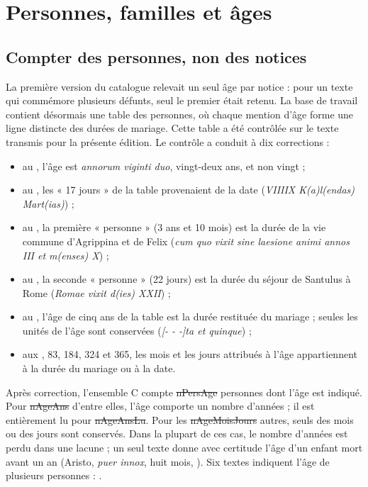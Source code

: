 \chapter{Personnes, familles et âges}\label{ch:personnes}

\section{Compter des personnes, non des notices}

La première version du catalogue relevait un seul âge par notice : pour un texte qui commémore plusieurs défunts, seul le premier était retenu. La base de travail contient désormais une table des personnes, où chaque mention d’âge forme une ligne distincte des durées de mariage. Cette table a été contrôlée sur le texte transmis pour la présente édition. Le contrôle a conduit à dix corrections :

\begin{itemize}
\item au , l’âge est \emph{annorum viginti duo}, vingt-deux ans, et non vingt ;
\item au , les « 17 jours » de la table provenaient de la date (\emph{VIIIIX K(a)l(endas) Mart(ias)}) ;
\item au , la première « personne » (3 ans et 10 mois) est la durée de la vie commune d’Agrippina et de Felix (\emph{cum quo vixit sine laesione animi annos III et m(enses) X}) ;
\item au , la seconde « personne » (22 jours) est la durée du séjour de Santulus à Rome (\emph{Romae vixit d(ies) XXII}) ;
\item au , l’âge de cinq ans de la table est la durée restituée du mariage ; seules les unités de l’âge sont conservées (\emph{[- - -]ta et quinque}) ;
\item aux , 83, 184, 324 et 365, les mois et les jours attribués à l’âge appartiennent à la durée du mariage ou à la date.
\end{itemize}

Après correction, l’ensemble C compte \st{nPersAge} personnes dont l’âge est indiqué. Pour \st{nAgeAns} d’entre elles, l’âge comporte un nombre d’années ; il est entièrement lu pour \st{nAgeAnsLu}. Pour les \st{nAgeMoisJours} autres, seuls des mois ou des jours sont conservés. Dans la plupart de ces cas, le nombre d’années est perdu dans une lacune ; un seul texte donne avec certitude l’âge d’un enfant mort avant un an (Aristo, \emph{puer innox}, huit mois, ). Six textes indiquent l’âge de plusieurs personnes : .

